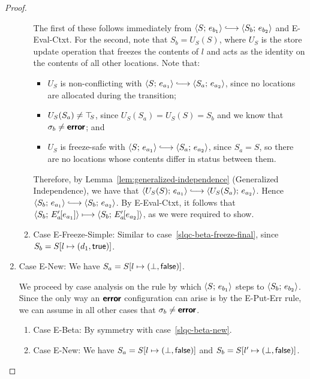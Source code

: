 \begin{proof}
\begin{enumerate}
\begin{enumerate}
      The first of these follows immediately from $\config{S}{e_{b_1}}
      \parstepsto \config{S_b}{e_{b_2}}$ and {\sc E-Eval-Ctxt}.  For
      the second, note that $S_b = U_S(S)$, where $U_S$ is the store
      update operation that freezes the contents of $l$ and acts as
      the identity on the contents of all other locations.  Note that:
      \begin{itemize}
        \item $U_S$ is non-conflicting with $\config{S}{e_{a_1}}
          \parstepsto \config{S_a}{e_{a_2}}$, since no locations are
          allocated during the transition;
        \item $U_S(S_a) \neq \top\hspace{-0.85mm}_{S}$, since $U_S(S_a) = U_S(S) = S_b$
          and we know that $\sigma_b \neq \textbf{\textsf{error}}$; and
        \item $U_S$ is freeze-safe with $\config{S}{e_{a_1}}
          \parstepsto \config{S_a}{e_{a_2}}$, since $S_a = S$, so
          there are no locations whose contents differ in status
          between them.
      \end{itemize}

      Therefore, by Lemma~\ref{lem:generalized-independence}
      (Generalized Independence), we have that
      $\config{U_S(S)}{e_{a_1}} \parstepsto
      \config{U_S(S_a)}{e_{a_2}}$.  Hence $\config{S_b}{e_{a_1}}
      \parstepsto \config{S_b}{e_{a_2}}$.  By {\sc E-Eval-Ctxt}, it
      follows that $\langle S_b;\, E'_a\hspace{-1mm}\left[e_{a_1}\right] \rangle \longmapsto
      \langle S_b;\, E'_a\hspace{-1mm}\left[e_{a_2}\right] \rangle$, as we were required to
      show.

    \item \label{slqc-beta-freeze-simple}Case {\sc E-Freeze-Simple}:
      Similar to case~\ref{slqc-beta-freeze-final}, since $S_b =
      S[l \mapsto (d_1, \textsf{true})]$.

    \end{enumerate}
  \item Case {\sc E-New}: We have $S_a = S[l \mapsto (\bot, \textsf{false})]$.

    We proceed by case analysis on the rule by which
    $\langle S;\, e_{b_1} \rangle$ steps to $\langle S_b;\, e_{b_2} \rangle$.  Since the
    only way an $\textbf{\textsf{error}}$ configuration can arise is by the {\sc
      E-Put-Err} rule, we can assume in all other cases that $\sigma_b
    \neq \textbf{\textsf{error}}$.
    \begin{enumerate}
    \item \label{slqc-new-beta}Case {\sc E-Beta}: By symmetry with case~\ref{slqc-beta-new}.
    \item \label{slqc-new-new}Case {\sc E-New}: We have $S_a =
      S[l \mapsto (\bot, \textsf{false})]$ and $S_b =
      S[l' \mapsto (\bot, \textsf{false})]$.


\end{enumerate}
\end{enumerate}
\end{proof}
